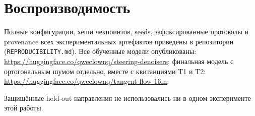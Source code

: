 \documentclass[10pt,a4paper]{article}
\begin{document}
\section*{Воспроизводимость}

Полные конфигурации, хеши чекпоинтов, seeds, зафиксированные протоколы и
provenance всех экспериментальных артефактов приведены в репозитории
(\texttt{REPRODUCIBILITY.md}). Все обученные модели опубликованы:
\url{https://huggingface.co/qweclownq/steering-denoisers}; финальная модель с
ортогональным шумом отдельно, вместе с квитанциями T1 и T2:
\url{https://huggingface.co/qweclownq/tangent-flow-16m}.

Защищённые held-out направления не использовались ни в одном эксперименте этой
работы.



\end{document}
